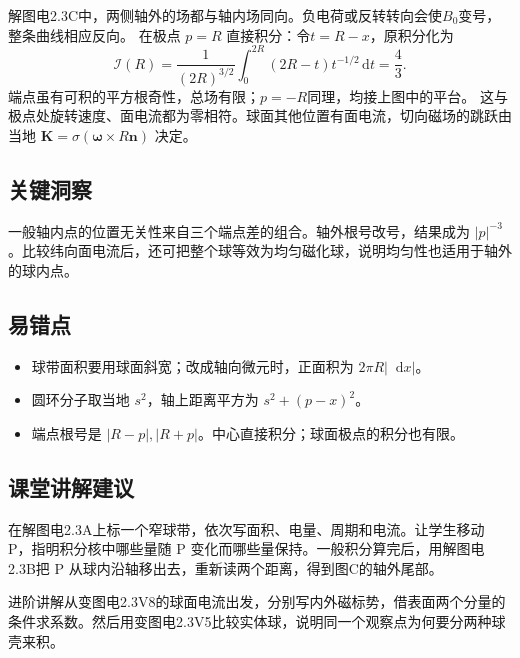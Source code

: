 \documentclass[UTF8,fontset=fandol,a4paper,11pt]{ctexart}
\newcommand{\dd}{\mathop{}\!\mathrm{d}}
\newcommand{\vect}[1]{\bm{#1}}
\begin{document}
解图电2.3C中，两侧轴外的场都与轴内场同向。负电荷或反转转向会使$B_0$变号，整条曲线相应反向。
在极点 $p=R$ 直接积分：令$t=R-x$，原积分化为
\[
\mathcal I(R)=\frac1{(2R)^{3/2}}\int_0^{2R}(2R-t)t^{-1/2}\,\mathrm dt
=\frac43.
\]
端点虽有可积的平方根奇性，总场有限；$p=-R$同理，均接上图中的平台。
这与极点处旋转速度、面电流都为零相符。球面其他位置有面电流，切向磁场的跳跃由当地 $\vect K=\sigma(\vect\omega\times R\vect n)$ 决定。



\subsection*{关键洞察}

一般轴内点的位置无关性来自三个端点差的组合。轴外根号改号，结果成为 $|p|^{-3}$。比较纬向面电流后，还可把整个球等效为均匀磁化球，说明均匀性也适用于轴外的球内点。



\subsection*{易错点}

\begin{itemize}
\item 球带面积要用球面斜宽；改成轴向微元时，正面积为 $2\pi R|\dd x|$。
\item 圆环分子取当地 $s^2$，轴上距离平方为 $s^2+(p-x)^2$。
\item 端点根号是 $|R-p|,|R+p|$。中心直接积分；球面极点的积分也有限。
\end{itemize}



\subsection*{课堂讲解建议}

在解图电2.3A上标一个窄球带，依次写面积、电量、周期和电流。让学生移动 P，指明积分核中哪些量随 P 变化而哪些量保持。一般积分算完后，用解图电2.3B把 P 从球内沿轴移出去，重新读两个距离，得到图C的轴外尾部。

进阶讲解从变图电2.3V8的球面电流出发，分别写内外磁标势，借表面两个分量的条件求系数。然后用变图电2.3V5比较实体球，说明同一个观察点为何要分两种球壳来积。
\end{document}
